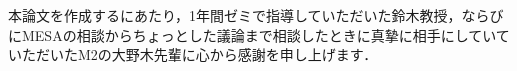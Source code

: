 \begin{acknowledgment}

本論文を作成するにあたり，1年間ゼミで指導していただいた鈴木教授，ならびにMESAの相談からちょっとした議論まで相談したときに真摯に相手にしていていただいたM2の大野木先輩に心から感謝を申し上げます．
  
\end{acknowledgment}
  